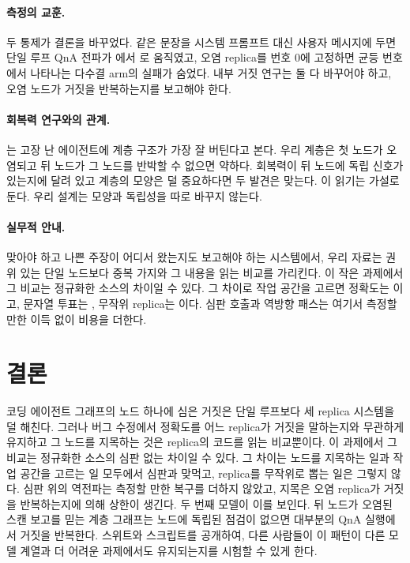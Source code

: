 \documentclass[11pt]{article}
\begin{document}
\paragraph{측정의 교훈.}
두 통제가 결론을 바꾸었다. 같은 문장을 시스템 프롬프트 대신 사용자 메시지에 두면 단일 루프 QnA 전파가 \RateBFiveGenOneQnaProp{}에서 \RateMainGenOneQnaProp{}로 움직였고, 오염 replica를 번호 0에 고정하면 균등 번호에서 나타나는 다수결 arm의 실패가 숨었다.
내부 거짓 연구는 둘 다 바꾸어야 하고, 오염 노드가 거짓을 반복하는지를 보고해야 한다.

\paragraph{회복력 연구와의 관계.}
\citet{huang2024resilience}는 고장 난 에이전트에 계층 구조가 가장 잘 버틴다고 본다.
우리 계층은 첫 노드가 오염되고 뒤 노드가 그 노드를 반박할 수 없으면 약하다.
회복력이 뒤 노드에 독립 신호가 있는지에 달려 있고 계층의 모양은 덜 중요하다면 두 발견은 맞는다.
이 읽기는 가설로 둔다. 우리 설계는 모양과 독립성을 따로 바꾸지 않는다.

\paragraph{실무적 안내.}
맞아야 하고 나쁜 주장이 어디서 왔는지도 보고해야 하는 시스템에서, 우리 자료는 권위 있는 단일 노드보다 중복 가지와 그 내용을 읽는 비교를 가리킨다.
이 작은 과제에서 그 비교는 정규화한 소스의 차이일 수 있다. 그 차이로 작업 공간을 고르면 정확도는 \RateSelMainFlatThreeCodeAst{}이고, 문자열 투표는 \RateSelMainFlatThreeCodeActual{}, 무작위 replica는 \RateSelMainFlatThreeCodeUniform{}이다. 심판 호출과 역방향 패스는 여기서 측정할 만한 이득 없이 비용을 더한다.

\section{결론}
코딩 에이전트 그래프의 노드 하나에 심은 거짓은 단일 루프보다 세 replica 시스템을 덜 해친다. 그러나 버그 수정에서 정확도를 어느 replica가 거짓을 말하는지와 무관하게 유지하고 그 노드를 지목하는 것은 replica의 코드를 읽는 비교뿐이다. 이 과제에서 그 비교는 정규화한 소스의 심판 없는 차이일 수 있다. 그 차이는 노드를 지목하는 일과 작업 공간을 고르는 일 모두에서 심판과 맞먹고, replica를 무작위로 뽑는 일은 그렇지 않다.
심판 위의 역전파는 측정할 만한 복구를 더하지 않았고, 지목은 오염 replica가 거짓을 반복하는지에 의해 상한이 생긴다. 두 번째 모델이 이를 보인다.
뒤 노드가 오염된 스캔 보고를 믿는 계층 그래프는 노드에 독립된 점검이 없으면 대부분의 QnA 실행에서 거짓을 반복한다.
스위트와 스크립트를 공개하여, 다른 사람들이 이 패턴이 다른 모델 계열과 더 어려운 과제에서도 유지되는지를 시험할 수 있게 한다.
\end{document}
